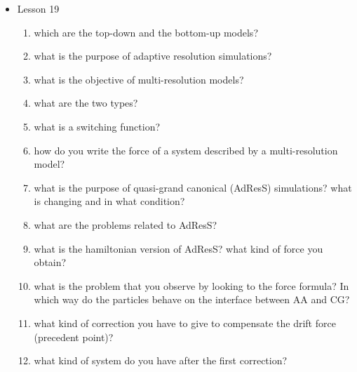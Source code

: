{\begin{itemize}
\begin{enumerate}
        \item how can you intend the position of a knot on a length? what type of ... you expect on the stationary points?
        \item what is interesting about knots in proteins? why you don't expect them?
        \item what characteristics are necessary for self-folding? what type of measures do you adopt as a consequence?
        \item what is an elastic folder model? what is its main role?
        \item what is the process through which you evlaluate the folding rate through the elastic folder model
        \item What type of measure do you adopt to evaluate the folding process?
        \item what is the RMSD?
        \item what is a LASSO protein? 
    \end{enumerate}
    \item Lesson 19
    \begin{enumerate}
        \item which are the top-down and the bottom-up models?
        \item what is the purpose of adaptive resolution simulations?
        \item what is the objective of multi-resolution models?
        \item what are the two types?
        \item what is a switching function?
        \item how do you write the force of a system described by a multi-resolution model?
        \item what is the purpose of quasi-grand canonical (AdResS) simulations? what is changing and in what condition?
        \item what are the problems related to AdResS?
        \item what is the hamiltonian version of AdResS? what kind of force you obtain?
        \item what is the problem that you observe by looking to the force formula? In which way do the particles behave on the interface between AA and CG?
        \item what kind of correction you have to give to compensate the drift force (precedent point)?
        \item what kind of system do you have after the first correction?

\end{enumerate}
\end{itemize}}
